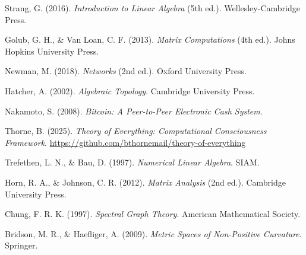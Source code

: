 \documentclass[11pt,a4paper]{article}
\theoremstyle{definition}
\theoremstyle{remark}
\begin{document}
\begin{thebibliography}{99}

Strang, G. (2016). \textit{Introduction to Linear Algebra} (5th ed.). Wellesley-Cambridge Press.

Golub, G. H., \& Van Loan, C. F. (2013). \textit{Matrix Computations} (4th ed.). Johns Hopkins University Press.

Newman, M. (2018). \textit{Networks} (2nd ed.). Oxford University Press.

Hatcher, A. (2002). \textit{Algebraic Topology}. Cambridge University Press.

Nakamoto, S. (2008). \textit{Bitcoin: A Peer-to-Peer Electronic Cash System}.

Thorne, B. (2025). \textit{Theory of Everything: Computational Consciousness Framework}. \url{https://github.com/bthornemail/theory-of-everything}

Trefethen, L. N., \& Bau, D. (1997). \textit{Numerical Linear Algebra}. SIAM.

Horn, R. A., \& Johnson, C. R. (2012). \textit{Matrix Analysis} (2nd ed.). Cambridge University Press.

Chung, F. R. K. (1997). \textit{Spectral Graph Theory}. American Mathematical Society.

Bridson, M. R., \& Haefliger, A. (2009). \textit{Metric Spaces of Non-Positive Curvature}. Springer.

\end{thebibliography}


\renewcommand{\algorithmicrequire}{\textbf{Input:}}
\renewcommand{\algorithmicensure}{\textbf{Output:}}

\newtheorem{conjecture}[theorem]{Conjecture}
\newtheorem{problem}[theorem]{Problem}

\newcommand{\Matrix}{\mathcal{M}}
\newcommand{\Vector}{\mathbf{v}}
\newcommand{\Identity}{\mathbf{I}}
\newcommand{\Zero}{\mathbf{0}}
\newcommand{\Expected}{\mathbb{E}}
\newcommand{\Variance}{\mathbb{V}}
\newcommand{\Covariance}{\mathbb{C}}
\end{document}
